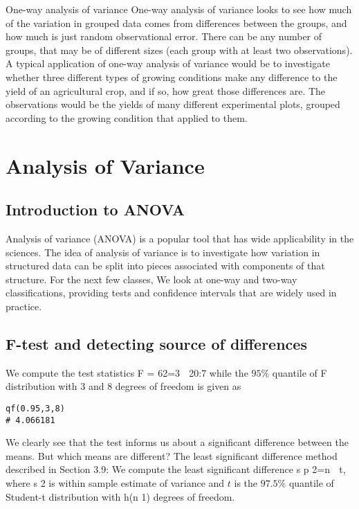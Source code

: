 One-way analysis of variance
One-way analysis of variance looks to see how much of the variation in grouped data comes from differences between the groups, and how much is just random observational error. There can be any number of groups, that may be of different sizes (each group with at least two observations). 
A typical application of one-way analysis of variance would be to investigate whether three different types of growing conditions make any difference to the yield of an agricultural crop, and if so, how great those differences are. The observations would be the yields of many different experimental plots, grouped according to the growing condition that applied to them.



\section{Analysis of Variance}

\subsection{Introduction to ANOVA}
Analysis of variance (ANOVA) is a popular tool that has wide applicability in the sciences. The idea of analysis of
variance is to investigate how variation in structured data can be split into pieces associated
with components of that structure. For the next few classes, We look at one-way and two-way
classifications, providing tests and confidence intervals that are widely used in practice.


\subsection{F-test and detecting source of differences}
We compute the test statistics F = 62=3  20:7 while the $95\%$ quantile of F
distribution with 3 and 8 degrees of freedom is given as
\begin{verbatim}
qf(0.95,3,8)
# 4.066181
\end{verbatim}
We clearly see that the test informs us about a significant difference between
the means.
But which means are different? The least significant difference method
described in Section 3.9:
We compute the least significant difference s
p
2=n  t, where s
2
is within
sample estimate of variance and $t$ is the $97.5\%$ quantile of Student-t
distribution with h(n  1) degrees of freedom.

